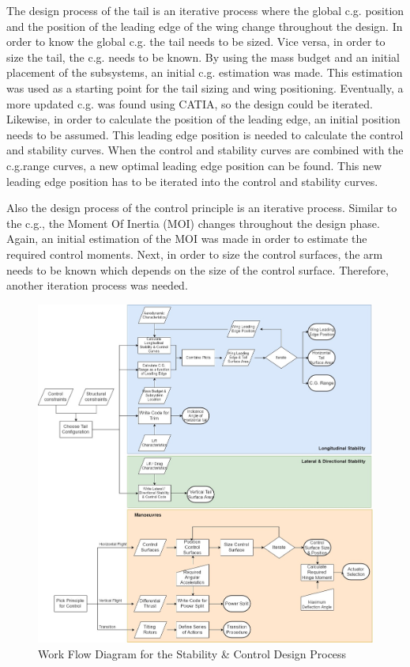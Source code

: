 The design process of the tail is an iterative process where the global c.g. position and the position of the leading edge of the wing change throughout the design. In order to know the global c.g. the tail needs to be sized. Vice versa, in order to size the tail, the c.g. needs to be known. By using the mass budget and an initial placement of the subsystems, an initial c.g. estimation was made. This estimation was used as a starting point for the tail sizing and wing positioning. Eventually, a more updated c.g. was found using CATIA, so the design could be iterated. Likewise, in order to calculate the position of the leading edge, an initial position needs to be assumed. This leading edge position is needed to calculate the control and stability curves. When the control and stability curves are combined with the c.g.range curves, a new optimal leading edge position can be found. This new leading edge position has to be iterated into the control and stability curves.  %

Also the design process of the control principle is an iterative process. Similar to the c.g., the Moment Of Inertia (MOI) changes throughout the design phase. Again, an initial estimation of the MOI was made in order to estimate the required control moments. Next, in order to size the control surfaces, the arm needs to be known which depends on the size of the control surface. Therefore, another iteration process was needed. %


\begin{figure}[htb]
    \centering
    \includegraphics[width=\textwidth]{StabilityandControl/Figures/workflowSNC}
    \caption{Work Flow Diagram for the Stability \& Control Design Process}
    \label{fig:StabContFlow}
\end{figure}

